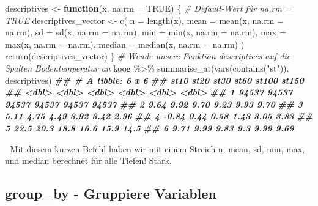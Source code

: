 \documentclass[
]{article}
\newenvironment{Shaded}{\begin{snugshade}}{\end{snugshade}}
\newcommand{\AttributeTok}[1]{\textcolor[rgb]{0.77,0.63,0.00}{#1}}
\newcommand{\CommentTok}[1]{\textcolor[rgb]{0.56,0.35,0.01}{\textit{#1}}}
\newcommand{\ConstantTok}[1]{\textcolor[rgb]{0.00,0.00,0.00}{#1}}
\newcommand{\ControlFlowTok}[1]{\textcolor[rgb]{0.13,0.29,0.53}{\textbf{#1}}}
\newcommand{\DocumentationTok}[1]{\textcolor[rgb]{0.56,0.35,0.01}{\textbf{\textit{#1}}}}
\newcommand{\FunctionTok}[1]{\textcolor[rgb]{0.00,0.00,0.00}{#1}}
\newcommand{\NormalTok}[1]{#1}
\newcommand{\OtherTok}[1]{\textcolor[rgb]{0.56,0.35,0.01}{#1}}
\newcommand{\SpecialCharTok}[1]{\textcolor[rgb]{0.00,0.00,0.00}{#1}}
\newcommand{\StringTok}[1]{\textcolor[rgb]{0.31,0.60,0.02}{#1}}
\begin{document}
\begin{Shaded}
\begin{Highlighting}[]
\NormalTok{descriptives }\OtherTok{\textless{}{-}} \ControlFlowTok{function}\NormalTok{(x, }\AttributeTok{na.rm =} \ConstantTok{TRUE}\NormalTok{) \{ }\CommentTok{\# Default{-}Wert für \textquotesingle{}na.rm\textquotesingle{} = TRUE}
\NormalTok{  descriptives\_vector }\OtherTok{\textless{}{-}} \FunctionTok{c}\NormalTok{(}
    \AttributeTok{n =} \FunctionTok{length}\NormalTok{(x),}
    \AttributeTok{mean =} \FunctionTok{mean}\NormalTok{(x, }\AttributeTok{na.rm =}\NormalTok{ na.rm), }
    \AttributeTok{sd =} \FunctionTok{sd}\NormalTok{(x, }\AttributeTok{na.rm =}\NormalTok{ na.rm),     }
    \AttributeTok{min =} \FunctionTok{min}\NormalTok{(x, }\AttributeTok{na.rm =}\NormalTok{ na.rm),   }
    \AttributeTok{max =} \FunctionTok{max}\NormalTok{(x, }\AttributeTok{na.rm =}\NormalTok{ na.rm),}
    \AttributeTok{median =} \FunctionTok{median}\NormalTok{(x, }\AttributeTok{na.rm =}\NormalTok{ na.rm)}
\NormalTok{  )}
  \FunctionTok{return}\NormalTok{(descriptives\_vector)}
\NormalTok{\}}
\CommentTok{\# Wende unsere Funktion descriptives auf die Spalten Bodentemperatur an}
\NormalTok{koog }\SpecialCharTok{\%\textgreater{}\%}
  \FunctionTok{summarise\_at}\NormalTok{(}\FunctionTok{vars}\NormalTok{(}\FunctionTok{contains}\NormalTok{(}\StringTok{"st"}\NormalTok{)), descriptives)}
\DocumentationTok{\#\# \# A tibble: 6 x 6}
\DocumentationTok{\#\#       st10     st20     st30     st60    st100    st150}
\DocumentationTok{\#\#      \textless{}dbl\textgreater{}    \textless{}dbl\textgreater{}    \textless{}dbl\textgreater{}    \textless{}dbl\textgreater{}    \textless{}dbl\textgreater{}    \textless{}dbl\textgreater{}}
\DocumentationTok{\#\# 1 94537    94537    94537    94537    94537    94537   }
\DocumentationTok{\#\# 2     9.64     9.92     9.70     9.23     9.93     9.70}
\DocumentationTok{\#\# 3     5.11     4.75     4.49     3.92     3.42     2.96}
\DocumentationTok{\#\# 4    {-}0.84     0.44     0.58     1.43     3.05     3.83}
\DocumentationTok{\#\# 5    22.5     20.3     18.8     16.6     15.9     14.5 }
\DocumentationTok{\#\# 6     9.71     9.99     9.83     9.3      9.99     9.69}
\end{Highlighting}
\end{Shaded}

🤯 Mit diesem kurzen Befehl haben wir mit einem Streich n, mean, sd, min, max, und median berechnet für alle Tiefen! Stark.

\hypertarget{group_by---gruppiere-variablen}{%
\subsection{group\_by - Gruppiere Variablen}\label{group_by---gruppiere-variablen}}
\end{document}
